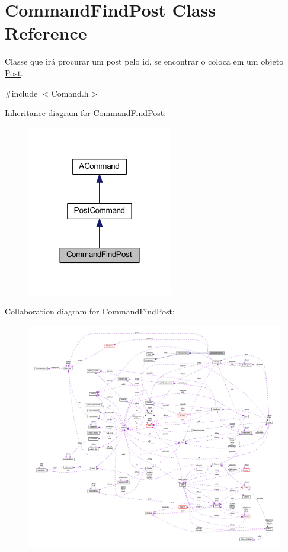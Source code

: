 \hypertarget{class_command_find_post}{\section{Command\-Find\-Post Class Reference}
\label{class_command_find_post}
}


Classe que irá procurar um post pelo id, se encontrar o coloca em um objeto \hyperlink{class_post}{Post}.  




{\ttfamily \#include $<$Comand.\-h$>$}



Inheritance diagram for Command\-Find\-Post\-:\nopagebreak
\begin{figure}[H]
\begin{center}
\leavevmode
\includegraphics[width=180pt]{class_command_find_post__inherit__graph}
\end{center}
\end{figure}


Collaboration diagram for Command\-Find\-Post\-:\nopagebreak
\begin{figure}[H]
\begin{center}
\leavevmode
\includegraphics[width=350pt]{class_command_find_post__coll__graph}
\end{center}
\end{figure}
